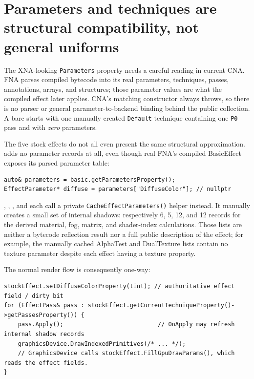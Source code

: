 \section{Parameters and techniques are structural compatibility, not general uniforms}
\label{sec:stock-effect-parameter-boundary}

The XNA-looking \texttt{Parameters} property needs a careful reading in current CNA. FNA parses
compiled bytecode into its real parameters, techniques, passes, annotations, arrays, and
structures; those parameter values are what the compiled effect later applies. CNA's matching
constructor always throws, so there is no parser or general parameter-to-backend binding behind
the public collection. A bare  starts with one manually created
\texttt{Default} technique containing one \texttt{P0} pass and with \emph{zero} parameters.

The five stock effects do not all even present the same structural approximation.
 adds no parameter records at all, even though real FNA's compiled
BasicEffect exposes its parsed parameter table:

\begin{lstlisting}
auto& parameters = basic.getParametersProperty();
EffectParameter* diffuse = parameters["DiffuseColor"]; // nullptr
\end{lstlisting}

,
, , and 
each call a private \texttt{CacheEffectParameters()} helper instead. It manually creates a
small set of internal shadows: respectively 6, 5, 12, and 12 records for the derived material,
fog, matrix, and shader-index calculations. Those lists are neither a bytecode reflection result
nor a full public description of the effect; for example, the manually cached AlphaTest and
DualTexture lists contain no texture parameter despite each effect having a texture property.

The normal render flow is consequently one-way:

\begin{lstlisting}
stockEffect.setDiffuseColorProperty(tint); // authoritative effect field / dirty bit
for (EffectPass& pass : stockEffect.getCurrentTechniqueProperty()->getPassesProperty()) {
    pass.Apply();                           // OnApply may refresh internal shadow records
    graphicsDevice.DrawIndexedPrimitives(/* ... */);
    // GraphicsDevice calls stockEffect.FillGpuDrawParams(), which reads the effect fields.
}
\end{lstlisting}

